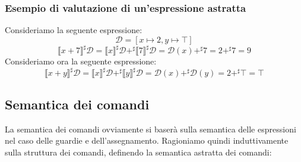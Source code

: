 \subsubsection{Esempio di valutazione di un'espressione astratta}
Consideriamo la seguente espressione:
\[
  \mathcal{D} = [x \mapsto 2, y \mapsto \top] 
\]
\[ 
    \llbracket x + 7 \rrbracket^\sharp \mathcal{D} =
    \llbracket x \rrbracket^\sharp \mathcal{D} +^\sharp 
    \llbracket 7 \rrbracket^\sharp \mathcal{D} =
    \mathcal{D}(x) +^\sharp 7 = 2 +^\sharp 7 = 9
\]
Consideriamo ora la seguente espressione:
\[
  \llbracket x + y \rrbracket^\sharp \mathcal{D} =
    \llbracket x \rrbracket^\sharp \mathcal{D} +^\sharp
    \llbracket y \rrbracket^\sharp \mathcal{D} =
    \mathcal{D}(x) +^\sharp \mathcal{D}(y) = 2 +^\sharp \top = \top
\]
\subsection{Semantica dei comandi}
La semantica dei comandi ovviamente si baserà sulla semantica delle espressioni 
nel caso delle guardie e dell'assegnamento. Ragioniamo quindi induttivamente sulla
struttura dei comandi, definendo la semantica astratta dei comandi:
